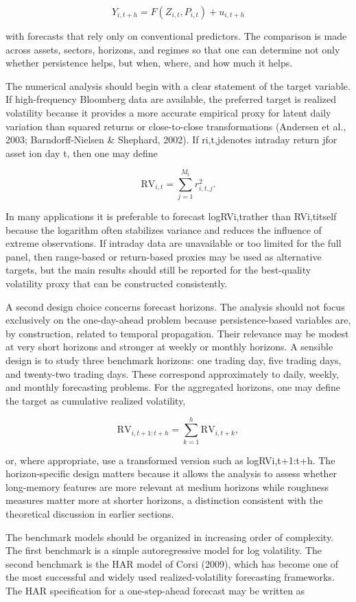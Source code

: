 \documentclass[12pt]{article}
\begin{document}
\[Y_{i,t+h} = F(Z_{i,t}, P_{i,t}) + u_{i,t+h}\]

with forecasts that rely only on conventional predictors. The comparison is made across assets, sectors, horizons, and regimes so that one can determine not only whether persistence helps, but when, where, and how much it helps.

The numerical analysis should begin with a clear statement of the target variable. If high-frequency Bloomberg data are available, the preferred target is realized volatility because it provides a more accurate empirical proxy for latent daily variation than squared returns or close-to-close transformations (Andersen et al., 2003; Barndorff-Nielsen \& Shephard, 2002). If ri,t,jdenotes intraday return jfor asset ion day t, then one may define

\[\mathrm{RV}_{i,t} = \sum_{j=1}^{M_t} r_{i,t,j}^2.\]

In many applications it is preferable to forecast logRVi,trather than RVi,titself because the logarithm often stabilizes variance and reduces the influence of extreme observations. If intraday data are unavailable or too limited for the full panel, then range-based or return-based proxies may be used as alternative targets, but the main results should still be reported for the best-quality volatility proxy that can be constructed consistently.

A second design choice concerns forecast horizons. The analysis should not focus exclusively on the one-day-ahead problem because persistence-based variables are, by construction, related to temporal propagation. Their relevance may be modest at very short horizons and stronger at weekly or monthly horizons. A sensible design is to study three benchmark horizons: one trading day, five trading days, and twenty-two trading days. These correspond approximately to daily, weekly, and monthly forecasting problems. For the aggregated horizons, one may define the target as cumulative realized volatility,

\[\mathrm{RV}_{i,t+1:t+h} = \sum_{k=1}^{h} \mathrm{RV}_{i,t+k},\]

or, where appropriate, use a transformed version such as logRVi,t+1:t+h. The horizon-specific design matters because it allows the analysis to assess whether long-memory features are more relevant at medium horizons while roughness measures matter more at shorter horizons, a distinction consistent with the theoretical discussion in earlier sections.

The benchmark models should be organized in increasing order of complexity. The first benchmark is a simple autoregressive model for log volatility. The second benchmark is the HAR model of Corsi (2009), which has become one of the most successful and widely used realized-volatility forecasting frameworks. The HAR specification for a one-step-ahead forecast may be written as
\end{document}
